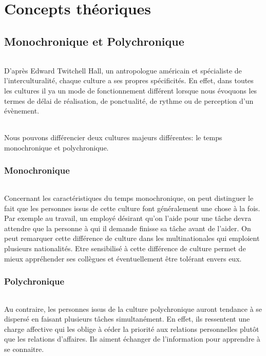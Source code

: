 \part{Concepts théoriques}

\chapter[Monochr. et Polychr.]{Monochronique et Polychronique}

\paragraph{} D'après Edward Twitchell Hall, un antropologue américain et
spécialiste de l'interculturalité, chaque culture a ses propres spécificités.
En effet, dans toutes les cultures il ya un mode de fonctionnement différent
lorsque nous évoquons les termes de délai de réalisation, de ponctualité, de
rythme ou de perception d'un évènement.

\paragraph{} Nous pouvons différencier deux cultures majeurs différentes: le
temps monochronique et polychronique.

\section{Monochronique}

\paragraph{} Concernant les caractéristiques du temps monochronique, on peut
distinguer le fait que les personnes issus de cette culture font généralement
une chose à la fois. Par exemple au travail, un employé désirant qu'on l'aide
pour une tâche devra attendre que la personne à qui il demande finisse sa tâche
avant de l'aider. On peut remarquer cette différence de culture dans les
multinationales qui emploient plusieurs nationalités. Etre sensibilisé à cette
différence de culture permet de mieux appréhender ses collègues et
éventuellement être tolérant envers eux.

\section{Polychronique}

\paragraph{} Au contraire, les personnes issus de la culture polychronique
auront tendance à se dispersé en faisant plusieurs tâches simultanément. En
effet, ils ressentent une charge affective qui les oblige à céder la priorité
aux relations personnelles plutôt que les relations d'affaires. Ils aiment
échanger de l'information pour apprendre à se connaitre.

